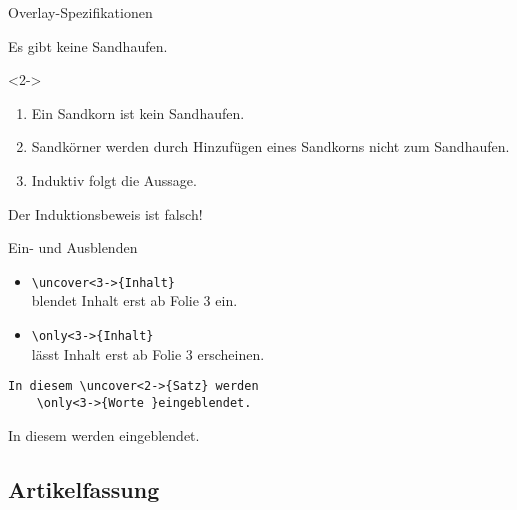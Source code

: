 \begin{Frame}{Overlay-Spezifikationen}
  \begin{Satz}[Sandhaufensatz]
    Es gibt keine Sandhaufen.
  \end{Satz}

  \begin{Beweis}<2->
    \begin{enumerate}
      \item<3-> Ein Sandkorn ist kein Sandhaufen.
      \item<4-> Sandkörner werden durch Hinzufügen
        eines Sandkorns nicht zum Sandhaufen.
      \item Induktiv folgt die Aussage. \qedhere
    \end{enumerate}
  \end{Beweis}


  Der \alert<6>{Induktionsbeweis} ist
  \alert<7>{falsch}!
\end{Frame}

\begin{Frame}[fragile]{Ein- und Ausblenden}
  \begin{itemize}
    \item \lstinline|\uncover<3->{Inhalt}|\\ blendet Inhalt erst ab Folie 3 ein.
    \item \lstinline|\only<3->{Inhalt}|\\ lässt Inhalt erst ab Folie 3 erscheinen.
  \end{itemize}

  \xxx
  \pause

  \begin{lstlisting}[gobble=4]
    In diesem \uncover<2->{Satz} werden
    \only<3->{Worte }eingeblendet.
  \end{lstlisting}
  In diesem  werden eingeblendet.
\end{Frame}

\subsection{Artikelfassung}

